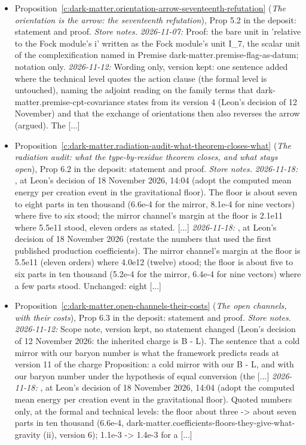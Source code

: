 \documentclass[11pt]{article}
\theoremstyle{definition}
\theoremstyle{plain}
\begin{document}
\begin{itemize}
\item Proposition~\ref{c:dark-matter.orientation-arrow-seventeenth-refutation} (\emph{The orientation is the arrow: the seventeenth refutation}), Prop 5.2 in the deposit: statement and proof. \emph{Store notes.} \emph{2026-11-07:} Proof: the bare unit in 'relative to the Fock module's i' written as the Fock module's unit I\_7, the scalar unit of the complexification named in Premise dark-matter.premise-flag-as-datum; notation only. \emph{2026-11-12:} Wording only, version kept: one sentence added where the technical level quotes the action clause (the formal level is untouched), naming the adjoint reading on the family terms that dark-matter.premise-cpt-covariance states from its version 4 (Leon's decision of 12 November) and that the exchange of orientations then also reverses the arrow (argued). The [...]
\item Proposition~\ref{c:dark-matter.radiation-audit-what-theorem-closes-what} (\emph{The radiation audit: what the type-by-residue theorem closes, and what stays open}), Prop 6.2 in the deposit: statement and proof. \emph{Store notes.} \emph{2026-11-18:} , at Leon's decision of 18 November 2026, 14:04 (adopt the computed mean energy per creation event in the gravitational floor). The floor is about seven to eight parts in ten thousand (6.6e-4 for the mirror, 8.1e-4 for nine vectors) where five to six stood; the mirror channel's margin at the floor is 2.1e11 where 5.5e11 stood, eleven orders as stated. [...] \emph{2026-11-18:} , at Leon's decision of 18 November 2026 (restate the numbers that used the first published production coefficients). The mirror channel's margin at the floor is 5.5e11 (eleven orders) where 4.0e12 (twelve) stood; the floor is about five to six parts in ten thousand (5.2e-4 for the mirror, 6.4e-4 for nine vectors) where a few parts stood. Unchanged: eight [...]
\item Proposition~\ref{c:dark-matter.open-channels-their-costs} (\emph{The open channels, with their costs}), Prop 6.3 in the deposit: statement and proof. \emph{Store notes.} \emph{2026-11-12:} Scope note, version kept, no statement changed (Leon's decision of 12 November 2026: the inherited charge is B - L). The sentence that a cold mirror with our baryon number is what the framework predicts reads at version 11 of the charge Proposition: a cold mirror with our B - L, and with our baryon number under the hypothesis of equal conversion (the [...] \emph{2026-11-18:} , at Leon's decision of 18 November 2026, 14:04 (adopt the computed mean energy per creation event in the gravitational floor). Quoted numbers only, at the formal and technical levels: the floor about three -> about seven parts in ten thousand (6.6e-4, dark-matter.coefficients-floors-they-give-what-gravity (ii), version 6); 1.1e-3 -> 1.4e-3 for a [...]

\end{itemize}
\end{document}
